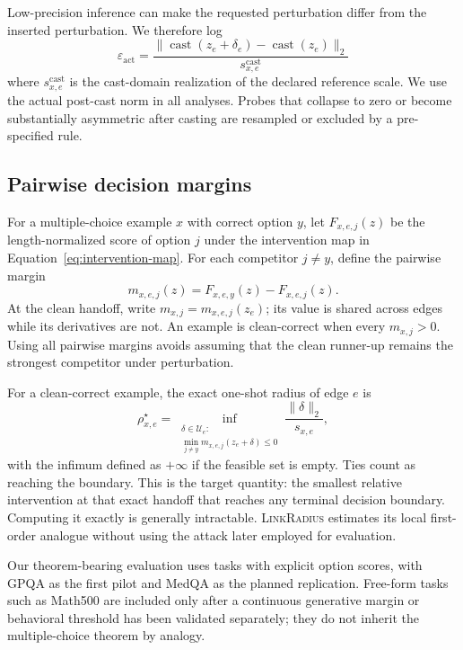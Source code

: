 \documentclass[11pt]{article}
\newcommand{\eps}{\varepsilon}
\newcommand{\method}{\textsc{LinkRadius}}
\begin{document}
Low-precision inference can make the requested perturbation differ from the
inserted perturbation. We therefore log
\begin{equation}
    \eps_{\mathrm{act}}
    =
    \frac{\|\operatorname{cast}(z_e+\delta_e)-
    \operatorname{cast}(z_e)\|_2}{s_{x,e}^{\mathrm{cast}}}
\end{equation}
where \(s_{x,e}^{\mathrm{cast}}\) is the cast-domain realization of the
declared reference scale. We use the actual post-cast norm in all analyses.
Probes that collapse to zero
or become substantially asymmetric after casting are resampled or excluded by
a pre-specified rule.

\subsection{Pairwise decision margins}

For a multiple-choice example $x$ with correct option $y$, let
\(F_{x,e,j}(z)\) be the length-normalized score of option $j$ under the
intervention map in Equation~\eqref{eq:intervention-map}. For each competitor
$j\ne y$, define the pairwise margin
\begin{equation}
    m_{x,e,j}(z)=F_{x,e,y}(z)-F_{x,e,j}(z).
    \label{eq:pairwise-margin}
\end{equation}
At the clean handoff, write \(m_{x,j}=m_{x,e,j}(z_e)\); its value is shared
across edges while its derivatives are not. An example is clean-correct when
every \(m_{x,j}>0\). Using all pairwise margins avoids assuming that the clean
runner-up remains the strongest competitor under perturbation.

For a clean-correct example, the exact one-shot radius of edge \(e\) is
\begin{equation}
    \rho^\star_{x,e}
    =
    \inf_{\substack{\delta\in\mathcal U_e:\\
    \min_{j\ne y}m_{x,e,j}(z_e+\delta)\le 0}}
    \frac{\|\delta\|_2}{s_{x,e}},
    \label{eq:exact-edge-radius}
\end{equation}
with the infimum defined as \(+\infty\) if the feasible set is empty. Ties
count as reaching the boundary. This is the target quantity: the smallest
relative intervention at that exact handoff that reaches any terminal decision
boundary. Computing it exactly is generally intractable. \method{} estimates
its local first-order analogue without using the attack later employed for
evaluation.

Our theorem-bearing evaluation uses tasks with explicit option scores, with
GPQA as the first pilot and MedQA as the planned replication. Free-form tasks
such as Math500 are included only after a continuous generative margin or
behavioral threshold has been validated separately; they do not inherit the
multiple-choice theorem by analogy.
\end{document}
